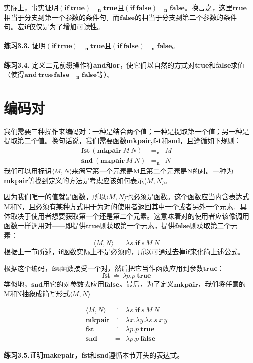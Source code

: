 \documentclass{book}
\def\n{\mathbf{n}}
\def\lianxi{\noindent \makebox[0pt][r]{$\rhd$} \textbf}
\begin{document}
实际上，事实证明$(\mathbf{if}\ \mathbf{true})=_\textbf{n}\mathbf{true}$且$(\mathbf{if}\ \mathbf{false})=_\textbf{n}\mathbf{false}$。换言之，这里$\mathbf{true}$相当于分支到第一个参数的条件句，而$\mathbf{false}$的相当于分支到第二个参数的条件句。宏$\mathbf{if}$仅仅是为了增加可读性。\\\\
\lianxi{练习3.3.} 证明$(\mathbf{if\ true})=_\n \mathbf{true}$且$ (\mathbf{if\ false})=_\n \mathbf{false}$。\\\\
\lianxi{练习3.4.} 定义二元前缀操作符\textbf{and}和\textbf{or}，使它们以自然的方式对\textbf{true}和\textbf{false}求值（使得$\mathbf{and\ true\ false}=_\n\mathbf{false}$等）。
\section{编码对}
我们需要三种操作来编码对：一种是结合两个值；一种是提取第一个值；另一种是提取第二个值。换句话说，我们需要函数\textbf{mkpair,fst}和\textbf{snd}，且遵循如下规则：
$$
\begin{array}{lll}
 \mathbf{fst}\ (\mathbf{mkpair}\ M\ N) & =_\textbf{n} & M\\
 \mathbf{snd}\ (\mathbf{mkpair}\ M\ N) & =_\textbf{n} & N
\end{array}
$$
我们可以用标识$\langle M,N\rangle$来简写第一个元素是M且第二个元素是N的对。一种为\textbf{mkpair}等找到定义的方法是考虑应该如何表示$\langle M,N\rangle$。\par
因为我们唯一的值就是函数，所以$\langle M,N\rangle$也必须是函数。这个函数应当内含表达式M和N，且必须有某种方式用于为对的使用者返回其中一个或者另外一个元素，具体取决于使用者想要获取第一个还是第二个元素。这意味着对的使用者应该像调用函数一样调用对——即提供$\mathbf{true}$则获取第一个元素，提供$\mathbf{false}$则获取第二个元素：
$$
\langle M,N\rangle\ \stackrel{.}{=}\ \lambda s.\mathbf{if}\ s\ M\ N
$$
根据上一节所述，$\mathbf{if}$函数实际上不是必须的，所以可通过去掉$\mathbf{if}$来化简上述公式。\par
根据这个编码，$\mathbf{fst}$函数接受一个对，然后把它当作函数应用到参数$\mathbf{true}$：
$$
\mathbf{fst}\ \stackrel{.}{=}\ \lambda p.p\ \mathbf{true}
$$
类似地，$\mathbf{snd}$用它的对参数去应用$\mathbf{false}$。最后，为了定义$\mathbf{mkpair}$，我们将任意的M和N抽象成简写形式$\langle M,N\rangle$
\begin{framed}
 $$
 \begin{array}{lll}
  \langle M,N\rangle\ & \stackrel{.}{=} & \lambda s.\mathbf{if}\ s\ M\ N\\
  \mathbf{mkpair} & \stackrel{.}{=} & \lambda x.\lambda y.\lambda s.s\ x\ y\\
  \mathbf{fst} & \stackrel{.}{=} & \lambda p.p\ \mathbf{true}\\
  \mathbf{snd} & \stackrel{.}{=} & \lambda p.p\ \mathbf{false}
 \end{array}
 $$
\end{framed}
\lianxi{练习3.5.}证明\textbf{makepair，fst}和\textbf{snd}遵循本节开头的表达式。
\end{document}
